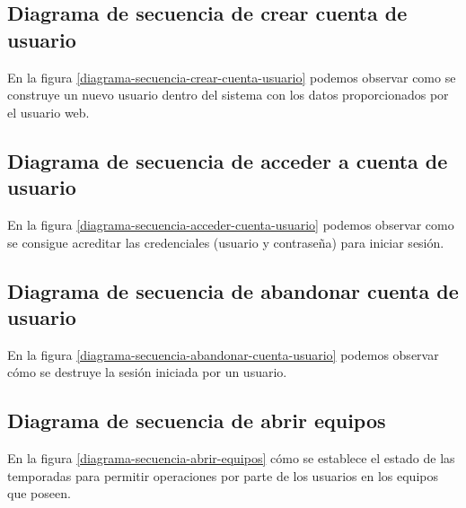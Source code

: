 \subsection*{Diagrama de secuencia de crear cuenta de usuario}

En la figura \ref{diagrama-secuencia-crear-cuenta-usuario} podemos observar como
se construye un nuevo usuario dentro del sistema con los datos proporcionados
por el usuario web.

 \newpage

\subsection*{Diagrama de secuencia de acceder a cuenta de usuario}

En la figura \ref{diagrama-secuencia-acceder-cuenta-usuario} podemos observar
como se consigue acreditar las credenciales (usuario y contraseña) para iniciar
sesión.

 \newpage

\subsection*{Diagrama de secuencia de abandonar cuenta de usuario}

En la figura \ref{diagrama-secuencia-abandonar-cuenta-usuario} podemos observar
cómo se destruye la sesión iniciada por un usuario.

 \newpage

\subsection*{Diagrama de secuencia de abrir equipos}

En la figura \ref{diagrama-secuencia-abrir-equipos} cómo se establece el estado
de las temporadas para permitir operaciones por parte de los usuarios en los
equipos que poseen.


